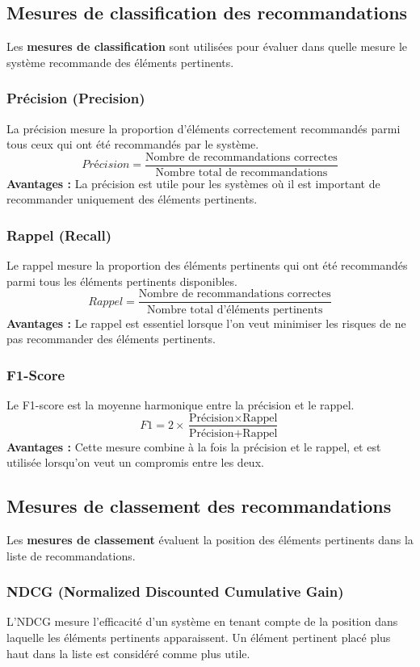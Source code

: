 \subsection{Mesures de classification des recommandations}

Les \textbf{mesures de classification} sont utilisées pour évaluer dans quelle mesure le système recommande des éléments pertinents.

\subsubsection{Précision (Precision)}
La précision mesure la proportion d'éléments correctement recommandés parmi tous ceux qui ont été recommandés par le système.
\[
Précision = \frac{\text{Nombre de recommandations correctes}}{\text{Nombre total de recommandations}}
\]
\textbf{Avantages :} La précision est utile pour les systèmes où il est important de recommander uniquement des éléments pertinents.

\subsubsection{Rappel (Recall)}
Le rappel mesure la proportion des éléments pertinents qui ont été recommandés parmi tous les éléments pertinents disponibles.
\[
Rappel = \frac{\text{Nombre de recommandations correctes}}{\text{Nombre total d'éléments pertinents}}
\]
\textbf{Avantages :} Le rappel est essentiel lorsque l’on veut minimiser les risques de ne pas recommander des éléments pertinents.

\subsubsection{F1-Score}
Le F1-score est la moyenne harmonique entre la précision et le rappel.
\[
F1 = 2 \times \frac{\text{Précision} \times \text{Rappel}}{\text{Précision} + \text{Rappel}}
\]
\textbf{Avantages :} Cette mesure combine à la fois la précision et le rappel, et est utilisée lorsqu’on veut un compromis entre les deux.

\subsection{Mesures de classement des recommandations}

Les \textbf{mesures de classement} évaluent la position des éléments pertinents dans la liste de recommandations.

\subsubsection{NDCG (Normalized Discounted Cumulative Gain)}
L’NDCG mesure l’efficacité d'un système en tenant compte de la position dans laquelle les éléments pertinents apparaissent. Un élément pertinent placé plus haut dans la liste est considéré comme plus utile.

